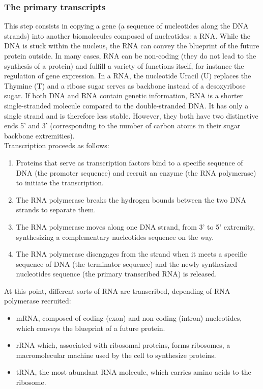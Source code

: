 \subsubsection{The primary transcripts}

This step consists in copying a gene (a sequence of nucleotides along the \ac{DNA} strands) into another biomolecules composed of nucleotides: a \ac{RNA}.
While the \ac{DNA} is stuck within the nucleus, the \ac{RNA} can convey the blueprint of the future protein outside.
In many cases, \ac{RNA} can be non-coding (they do not lead to the synthesis of a protein) and fulfill a variety of functions itself, for instance the regulation of gene expression.
In a \ac{RNA}, the nucleotide Uracil (U) replaces the Thymine (T) and a ribose sugar serves as backbone instead of a desoxyribose sugar.
If both \ac{DNA} and \ac{RNA} contain genetic information, \ac{RNA} is a shorter single-stranded molecule compared to the double-stranded \ac{DNA}.
It has only a single strand and is therefore less stable.
However, they both have two distinctive ends 5' and 3' (corresponding to the number of carbon atoms in their sugar backbone extremities).\\

\noindent
Transcription proceeds as follows:
\begin{enumerate}
	\setlength\itemsep{0.1em}
	\item Proteins that serve as transcription factors bind to a specific sequence of \ac{DNA} (the promoter sequence) and recruit an enzyme (the \ac{RNA} polymerase) to initiate the transcription.
	\item The \ac{RNA} polymerase breaks the hydrogen bounds between the two \ac{DNA} strands to separate them.
	\item The \ac{RNA} polymerase moves along one \ac{DNA} strand, from 3' to 5' extremity, synthesizing a complementary nucleotides sequence on the way.
	\item The \ac{RNA} polymerase disengages from the strand when it meets a specific sequence of \ac{DNA} (the terminator sequence) and the newly synthesized nucleotides sequence (the primary transcribed \ac{RNA}) is released.
\end{enumerate}

\noindent
At this point, different sorts of \ac{RNA} are transcribed, depending of \ac{RNA} polymerase recruited:
\begin{itemize}
	\setlength\itemsep{0.1em}
	\item \ac{mRNA}, composed of coding (exon) and non-coding (intron) nucleotides, which conveys the blueprint of a future protein.
	\item \ac{rRNA} which, associated with ribosomal proteins, forms ribosomes, a macromolecular machine used by the cell to synthesize proteins.
	\item \ac{tRNA}, the most abundant \ac{RNA} molecule, which carries amino acids to the ribosome.
\end{itemize}


